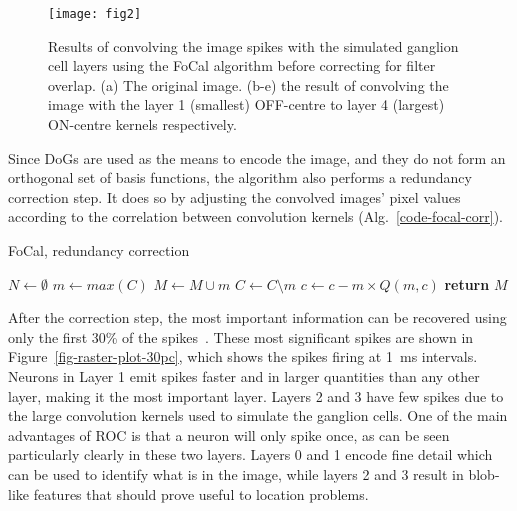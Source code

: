 \documentclass{frontiersENG} %
\begin{document}
\begin{figure}[hbt]
	\centering
	\texttt{[image: fig2]}
	\caption{Results of convolving the image spikes with the simulated ganglion cell layers using the FoCal algorithm before correcting for filter overlap. (a) The original image. (b-e) the result of convolving the image with the layer 1 (smallest) OFF-centre to layer 4 (largest) ON-centre kernels respectively.}
	\label{fig-convolution-results}
\end{figure}

Since DoGs are used as the means to encode the image, and they do not form an orthogonal set of basis functions, the algorithm also performs a redundancy correction step.
It does so by adjusting the convolved images' pixel values according to the correlation between convolution kernels (Alg.~\ref{code-focal-corr}).

\begin{algorithm}[h]
	\caption{FoCal, redundancy correction}
	\label{code-focal-corr}
	\begin{algorithmic}
		\State $N \leftarrow \emptyset$ 
		\Repeat
		\State $m \leftarrow max(C)$
		\State $M \leftarrow M \cup m$
		\State $C \leftarrow C \setminus m$
		 
		 
		\State $c \leftarrow c - m \times Q(m, c)$
		\EndIf
		\EndFor
		\State \textbf{return} $M$
		\EndProcedure
	\end{algorithmic}
\end{algorithm}


After the correction step, the most important information can be recovered using only the first 30\% of the spikes~\citep{sen2009evaluating}. These most significant spikes are shown in Figure~\ref{fig-raster-plot-30pc}, which shows the spikes firing at 1~ms intervals. Neurons in Layer 1 emit spikes faster and in larger quantities than any other layer, making it the most important layer. Layers 2 and 3 have few spikes due to the large convolution kernels used to simulate the ganglion cells. One of the main advantages of ROC is that a neuron will only spike once, as can be seen particularly clearly in these two layers. Layers 0 and 1 encode fine detail which can be used to identify what is in the image, while layers 2 and 3 result in blob-like features that should prove useful to location problems.
\end{document}
